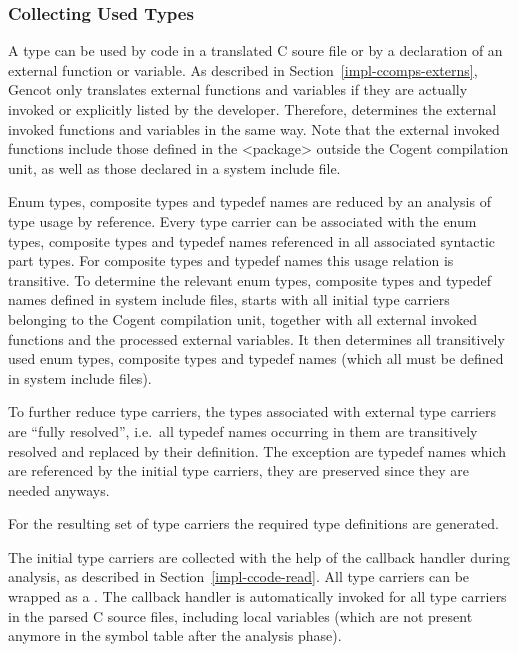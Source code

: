 \subsubsection{Collecting Used Types}

A type can be used by code in a translated C soure file or by a declaration of an external function or variable.
As described in Section~\ref{impl-ccomps-externs}, Gencot only translates external functions and variables if they are 
actually invoked or explicitly listed by the developer.
Therefore,  determines the external invoked functions and variables in the same way. Note that
the external invoked functions include those defined in the <package> outside the Cogent compilation unit, as well
as those declared in a system include file.

Enum types, composite types and typedef names are reduced by an analysis of type usage by reference. Every type carrier can be
associated with the enum types, composite types and typedef names referenced in all associated syntactic part types. For 
composite types and typedef names this usage relation is transitive. To determine the relevant enum types, composite types 
and typedef names defined in system include files,  starts with all initial type carriers belonging
to the Cogent compilation unit, together with all external invoked functions and the processed external variables. 
It then determines all transitively
used enum types, composite types and typedef names (which all must be defined in system include files).

To further reduce type carriers, the types associated with external type carriers are ``fully resolved'', i.e.~all
typedef names occurring in them are transitively resolved and replaced by their definition. The exception are
typedef names which are referenced by the initial type carriers, they are preserved since they are needed anyways.

For the resulting set of type carriers the required type definitions are generated.

The initial type carriers are collected with the help of the callback handler during analysis, as described in 
Section~\ref{impl-ccode-read}. All type carriers can be wrapped as a . The callback handler 
is automatically invoked for all type carriers in the parsed
C source files, including local variables (which are not present anymore in the symbol table after the analysis phase).

